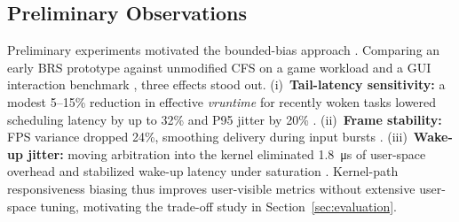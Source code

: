 \subsection{Preliminary Observations}
\label{subsec:observation}
Preliminary experiments motivated the bounded-bias approach \cite{10306992,4663063}. Comparing an early BRS prototype against unmodified CFS on a game workload and a GUI interaction benchmark \cite{8762113}, three effects stood out. (i)~\textbf{Tail-latency sensitivity:} a modest 5--15\% reduction in effective \textit{vruntime} for recently woken tasks lowered scheduling latency by up to 32\% and P95 jitter by 20\% \cite{4624248,8338088}. (ii)~\textbf{Frame stability:} FPS variance dropped 24\%, smoothing delivery during input bursts \cite{9121657}. (iii)~\textbf{Wake-up jitter:} moving arbitration into the kernel eliminated \SI{1.8}{\micro\second} of user-space overhead and stabilized wake-up latency under saturation \cite{67577}. Kernel-path responsiveness biasing thus improves user-visible metrics without extensive user-space tuning, motivating the trade-off study in Section~\ref{sec:evaluation}.
